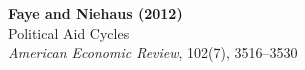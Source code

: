 \documentclass[12pt]{article}
\begin{document}
\begin{center}
{\Large\bfseries Faye and Niehaus (2012)}\\
{\large Political Aid Cycles}\\
\vspace{0.5em}
{\normalsize \textit{American Economic Review}, 102(7), 3516--3530}
\end{center}

\vspace{1em}




\end{document}
